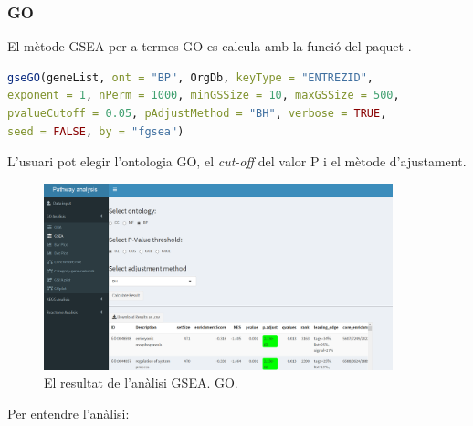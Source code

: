 \documentclass[]{article}
\begin{document}
\subsubsection{GO}
El mètode GSEA per a termes GO es calcula amb la funció  del paquet . 

\begin{lstlisting}[language=R]
gseGO(geneList, ont = "BP", OrgDb, keyType = "ENTREZID",
exponent = 1, nPerm = 1000, minGSSize = 10, maxGSSize = 500,
pvalueCutoff = 0.05, pAdjustMethod = "BH", verbose = TRUE,
seed = FALSE, by = "fgsea")
\end{lstlisting}

L'usuari pot elegir l'ontologia GO, el \textit{cut-off} del valor P i el mètode d'ajustament.
\begin{figure}[H]
\centering
\includegraphics[width=0.9\textwidth]{App_F11_Items_GO_GSEA.png} 
\caption{El resultat de l'anàlisi GSEA. GO.}
\end{figure}

Per entendre l'anàlisi:
\end{document}
